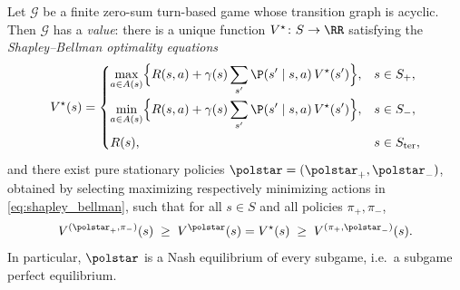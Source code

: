 \begin{theoremenv}\label{thm:shapley_bellman}
Let $\mathcal{G}$ be a finite zero-sum turn-based game whose transition graph is acyclic. Then $\mathcal{G}$ has a \emph{value}: there is a unique function $V^{\star} \colon S \to \RR$ satisfying the \emph{Shapley--Bellman optimality equations}
\begin{equation}
	V^{\star}(s) =
	\begin{cases}
		\displaystyle \max_{a \in A(s)} \Bigl\{ R(s,a) + \gamma(s) \sum_{s'} \P(s' \mid s, a)\, V^{\star}(s') \Bigr\}, & s \in S_{+}, \\[1.2em]
		\displaystyle \min_{a \in A(s)} \Bigl\{ R(s,a) + \gamma(s) \sum_{s'} \P(s' \mid s, a)\, V^{\star}(s') \Bigr\}, & s \in S_{-}, \\[1.2em]
		R(s), & s \in S_{\mathrm{ter}},
	\end{cases}
	\label{eq:shapley_bellman}
\end{equation}
and there exist pure stationary policies $\polstar = (\polstar_{+}, \polstar_{-})$, obtained by selecting maximizing respectively minimizing actions in \eqref{eq:shapley_bellman}, such that for all $s \in S$ and all policies $\pi_{+}, \pi_{-}$,
\begin{equation}
	V^{(\polstar_{+}, \pi_{-})}(s) \;\ge\; V^{\polstar}(s) = V^{\star}(s) \;\ge\; V^{(\pi_{+}, \polstar_{-})}(s).
	\label{eq:saddle_point}
\end{equation}
In particular, $\polstar$ is a Nash equilibrium of every subgame, i.e.\ a subgame perfect equilibrium.
\hfill{}
\end{theoremenv}

